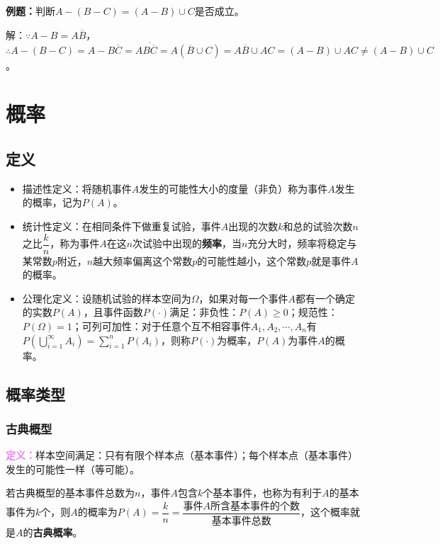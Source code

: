 \documentclass[UTF8, 12pt]{ctexart}
\begin{document}
\textbf{例题：}判断$A-(B-C)=(A-B)\cup C$是否成立。

解：$\because A-B=A\overline{B}$，$\therefore A-(B-C)=A-B\overline{C}=A\overline{B\overline{C}}=A(\overline{B}\cup C)=A\overline{B}\cup AC=(A-B)\cup AC\neq (A-B)\cup C$。

\section{概率}

\subsection{定义}

\begin{itemize}
    \item 描述性定义：将随机事件$A$发生的可能性大小的度量（非负）称为事件$A$发生的概率，记为$P(A)$。
    \item 统计性定义：在相同条件下做重复试验，事件$A$出现的次数$k$和总的试验次数$n$之比$\dfrac{k}{n}$，称为事件$A$在这$n$次试验中出现的\textbf{频率}，当$n$充分大时，频率将稳定与某常数$p$附近，$n$越大频率偏离这个常数$p$的可能性越小，这个常数$p$就是事件$A$的概率。
    \item 公理化定义：设随机试验的样本空间为$\Omega$，如果对每一个事件$A$都有一个确定的实数$P(A)$，且事件函数$P(\cdot)$满足：非负性：$P(A)\geqslant0$；规范性：$P(\Omega)=1$；可列可加性：对于任意个互不相容事件$A_1,A_2,\cdots,A_n$有$P(\bigcup\limits_{i=1}^\infty A_i)=\sum\limits_{i=1}^nP(A_i)$，则称$P(\cdot)$为概率，$P(A)$为事件$A$的概率。
\end{itemize}

\subsection{概率类型}

\subsubsection{古典概型}

\textcolor{violet}{\textbf{定义：}}样本空间满足：只有有限个样本点（基本事件）；每个样本点（基本事件）发生的可能性一样（等可能）。

若古典概型的基本事件总数为$n$，事件$A$包含$k$个基本事件，也称为有利于$A$的基本事件为$k$个，则$A$的概率为$P(A)=\dfrac{k}{n}=\dfrac{\text{事件}A\text{所含基本事件的个数}}{\text{基本事件总数}}$，这个概率就是$A$的\textbf{古典概率}。
\end{document}

